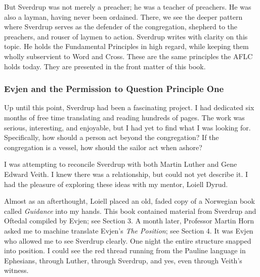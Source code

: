 But Sverdrup was not merely a preacher; he was a teacher of preachers. He was also a layman, having never been ordained. There, we see the deeper pattern where Sverdrup serves as the defender of the congregation, shepherd to the preachers, and rouser of laymen to action. Sverdrup writes with clarity on this topic. He holds the Fundamental Principles in high regard, while keeping them wholly subservient to Word and Cross. These are the same principles the AFLC holds today. They are presented in the front matter of this book.


\subsubsection{Evjen and the Permission to Question Principle One}

Up until this point, Sverdrup had been a fascinating project. I had dedicated six months of free time translating and reading hundreds of pages. The work was serious, interesting, and enjoyable, but I had yet to find what I was looking for. Specifically, how should a person act beyond the congregation? If the congregation is a vessel, how should the sailor act when ashore?

I was attempting to reconcile Sverdrup with both Martin Luther and Gene Edward Veith. I knew there was a relationship, but could not yet describe it. I had the pleasure of exploring these ideas with my mentor, Loiell Dyrud.

Almost as an afterthought, Loiell placed an old, faded copy of a Norwegian book called \textit{Guidance} into my hands. This book contained material from Sverdrup and Oftedal compiled by Evjen; see Section 3. A month later, Professor Martin Horn asked me to machine translate Evjen's \textit{The Position}; see Section 4. It was Evjen who allowed me to see Sverdrup clearly. One night the entire structure snapped into position. I could see the red thread running from the Pauline language in Ephesians, through Luther, through Sverdrup, and yes, even through Veith's witness.


